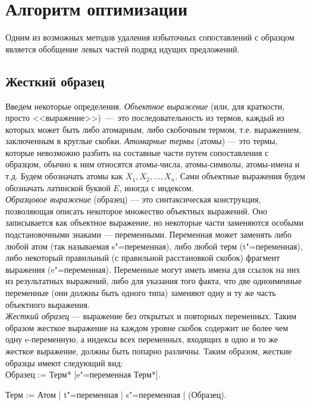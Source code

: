 \documentclass[12pt]{article}
\begin{document}
\section[Алгоритм оптимизации]{\large \centering Алгоритм оптимизации}
\hspace{\parindent}Одним из возможных методов удаления избыточных сопоставлений с образцом является обобщение левых частей подряд идущих предложений. 
\subsection[Жесткий образец]{\large Жесткий образец}
\hspace{\parindent} Введем некоторые определения. \textit{Объектное выражение} (или, для краткости, просто <<выражение>>)~---~это последовательность из термов, каждый из которых может быть либо атомарным, либо скобочным термом, т.е. выражением, заключенным в круглые скобки. \textit{Атомарные термы} (атомы) --- это термы, которые невозможно разбить на составные части путем сопоставления с образцом, обычно к ним относятся атомы-числа, атомы-символы, атомы-имена и т.д. Будем обозначать атомы как \(X_1, X_2, \dots, X_n\). Сами объектные выражения будем обозначать латинской буквой \(E\), иногда с индексом.\\
\indent \textit{Образцовое выражение} (образец) --- это синтаксическая конструкция, позволяющая описать некоторое множество объектных выражений. Оно записывается как объектное выражение, но некоторые части заменяются особыми подстановочными знаками --- переменными. Переменная может заменять либо любой атом (так называемая s"=переменная), либо любой терм (t"=переменная), либо некоторый правильный (с правильной расстановкой скобок) фрагмент выражения (e"=переменная). Переменные могут иметь имена для ссылок на них из результатных выражений, либо для указания того факта, что две одноименные переменные (они должны быть одного типа) заменяют одну и ту же часть объектного выражения.\\
\indent \textit{Жесткий образец} --- выражение без открытых и повторных переменных. Таким образом жесткое выражение на каждом уровне скобок содержит не более чем одну e-переменную, а индексы всех переменных, входящих в одно и то же жесткое выражение, должны быть попарно различны. Таким образом, жесткие образцы имеют следующий вид:\\

Образец := Терм* [e"=переменная Терм*].

Терм := Атом | t"=переменная | s"=переменная | (Образец).
\end{document}

